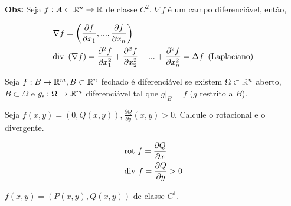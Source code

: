 \documentclass{book}
\begin{document}
\textbf{Obs:} Seja $f:A \subset \mathbb{R}^n  \to \mathbb{R}$ de classe $C^2$. $\nabla f$ \'e um campo diferenci\'avel, ent\~ao,

\[
\begin{gathered}
  \nabla f = \left( {\frac{{\partial f}}
{{\partial x_1 }},...,\frac{{\partial f}}
{{\partial x_n }}} \right) \hfill \\
  {\text{div }}\left( {\nabla f} \right) = \frac{{\partial ^2 f}}
{{\partial x_1^2 }} + \frac{{\partial ^2 f}}
{{\partial x_2^2 }} + ... + \frac{{\partial ^2 f}}
{{\partial x_n^2 }} = \Delta f{\text{ }}\left( {{\text{Laplaciano}}} \right) \hfill \\
\end{gathered}
\]

\begin{defn}
Seja $f:B \to \mathbb{R}^m ,B \subset \mathbb{R}^n$ fechado \'e diferenci\'avel se existem $\Omega  \subset \mathbb{R}^n$ aberto, $B \subset \Omega$ e $g_i :\Omega  \to \mathbb{R}^m$ diferenci\'avel tal que $\left. g \right|_B  = f$ ($g$ restrito a $B$).
\end{defn}

\begin{ex}
Seja $f\left( {x,y} \right) = \left( {0,Q\left( {x,y} \right)} \right),\displaystyle \frac{{\partial Q}}{{\partial y}}\left( {x,y} \right) > 0$. Calcule o rotacional e o divergente.
\end{ex}

\begin{sol}
\[
\begin{gathered}
  {\text{rot }}f = \frac{{\partial Q}}
{{\partial x}} \hfill \\
  {\text{div }}f = \frac{{\partial Q}}
{{\partial y}} > 0 \hfill \\
\end{gathered}
\]

\end{sol}

\begin{ex}
$f\left( {x,y} \right) = \left( {P\left( {x,y} \right),Q\left( {x,y} \right)} \right)$ de classe $C^1$.
\end{ex}
\end{document}
